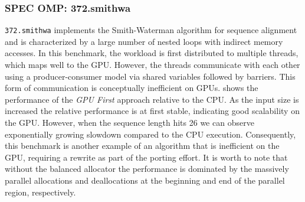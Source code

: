 \subsubsection{SPEC OMP: 372.smithwa}
\texttt{372.smithwa} implements the Smith-Waterman algorithm for sequence alignment and is characterized by a large number of nested loops with indirect memory accesses.
In this benchmark, the workload is first distributed to multiple threads, which maps well to the GPU.
However, the threads communicate with each other using a producer-consumer model via shared variables followed by barriers.
This form of communication is conceptually inefficient on GPUs.
 shows the performance of the \emph{GPU First} approach relative to the CPU.
As the input size is increased the relative performance is at first stable, indicating good scalability on the GPU.
However, when the sequence length hits 26 we can observe exponentially growing slowdown compared to the CPU execution.
Consequently, this benchmark is another example of an algorithm that is inefficient on the GPU, requiring a rewrite as part of the porting effort.
It is worth to note that without the balanced allocator the performance is dominated by the massively parallel allocations and deallocations at the beginning and end of the parallel region, respectively.
